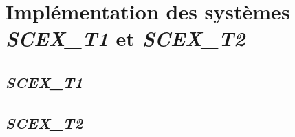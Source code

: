 \section{Implémentation des systèmes \textit{SCEX\_T1} et \textit{SCEX\_T2}}
\subsection{\textit{SCEX\_T1}}

\subsection{\textit{SCEX\_T2}}

